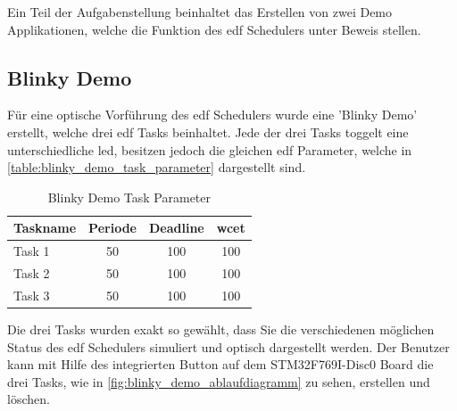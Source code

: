 \documentclass[../EDF Master Thesis.tex]{subfiles}
\begin{document}
    Ein Teil der Aufgabenstellung beinhaltet das Erstellen von zwei Demo Applikationen, welche die Funktion des \ac{edf} Schedulers unter Beweis stellen.

    \subsection{Blinky Demo} \label{section:blinky_demo}
        Für eine optische Vorführung des \ac{edf} Schedulers wurde eine 'Blinky Demo' erstellt, welche drei \ac{edf} Tasks beinhaltet.
        Jede der drei Tasks toggelt eine unterschiedliche \ac{led}, besitzen jedoch die gleichen \ac{edf} Parameter, welche in \autoref{table:blinky_demo_task_parameter} dargestellt sind.

        \begin{table}[ht!]
            \centering
            \begin{tabular}{l|c|c|c}
                Taskname & Periode & Deadline & \ac{wcet} \\
                \hline
                Task 1 & 50 & 100 & 100\\
                Task 2 & 50 & 100 & 100\\
                Task 3 & 50 & 100 & 100\\
            \end{tabular}
            \caption{Blinky Demo Task Parameter}
            \label{table:blinky_demo_task_parameter}
        \end{table}

        Die drei Tasks wurden exakt so gewählt, dass Sie die verschiedenen möglichen Status des \ac{edf} Schedulers simuliert und optisch dargestellt werden.
        Der Benutzer kann mit Hilfe des integrierten Button auf dem STM32F769I-Disc0 Board die drei Tasks, wie in \autoref{fig:blinky_demo_ablaufdiagramm} zu sehen, erstellen und löschen.
        
\end{document}
